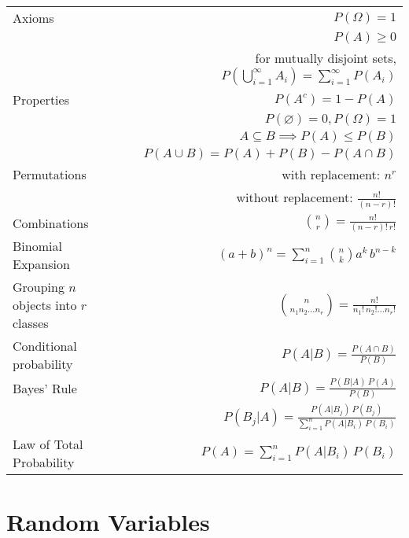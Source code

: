 \documentclass[a4paper,10pt]{article}
\begin{document}
\begin{tabularx}{\textwidth}{ l X r }
    Axioms && $P(\Omega) = 1$ \\[0.2cm]
           && $P(A) \geq 0$ \\[0.2cm]
           && for mutually disjoint sets, $P(\bigcup_{i=1}^{\infty}A_i) = \sum_{i=1}^{\infty}P(A_i)$ \\[0.2cm]

    Properties && $P(A^c) = 1-P(A)$ \\[0.2cm]
               && $P(\varnothing) = 0, P(\Omega) = 1$ \\[0.2cm]
               && $A\subseteq B \implies P(A) \leq P(B)$ \\[0.2cm]
               && $P(A\cup B) = P(A) + P(B) - P(A\cap B)$\\[0.2cm]

    Permutations && with replacement: $n^r$ \\[0.2cm]
                 && without replacement: $\frac{n!}{(n-r)!}$ \\[0.2cm]

    Combinations && ${n\choose r} = \frac{n!}{(n-r)!\,r!}$ \\[0.3cm]

    Binomial Expansion && $(a+b)^n = \sum_{i=1}^{n}{n\choose k}a^k\,b^{n-k}$ \\[0.3cm]

    Grouping $n$ objects into $r$ classes && ${n\choose n_1 n_2\ldots n_r} = \frac{n!}{n_1!\,n_2!\ldots n_r!}$ \\[0.3cm]

    Conditional probability && $P(A|B) = \frac{P(A\cap B)}{P(B)}$ \\[0.3cm]

    Bayes' Rule && $P(A|B) = \frac{P(B|A)\,P(A)}{P(B)}$ \\[0.3cm]
                && $P(B_j|A) = \frac{P(A|B_j)\,P(B_j)}{\sum_{i=1}^n P(A|B_i)\,P(B_i)}$ \\[0.3cm]

    Law of Total Probability && $P(A) = \sum_{i=1}^n P(A|B_i)\,P(B_i)$ \\
 
\end{tabularx}


\newpage
\section{Random Variables}
\end{document}
